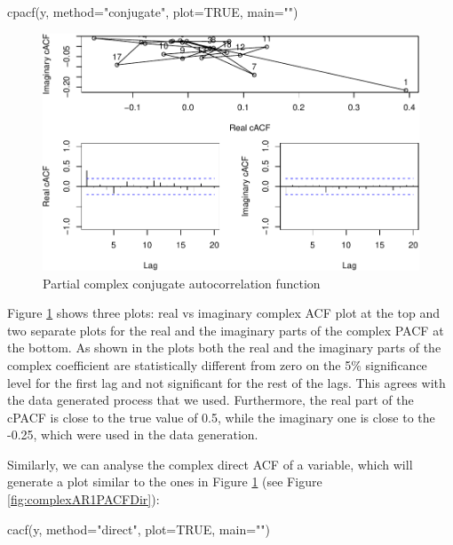 \documentclass[
]{book}
\newenvironment{Shaded}{\begin{snugshade}}{\end{snugshade}}
\newcommand{\AttributeTok}[1]{\textcolor[rgb]{0.77,0.63,0.00}{#1}}
\newcommand{\ConstantTok}[1]{\textcolor[rgb]{0.00,0.00,0.00}{#1}}
\newcommand{\FunctionTok}[1]{\textcolor[rgb]{0.00,0.00,0.00}{#1}}
\newcommand{\NormalTok}[1]{#1}
\newcommand{\StringTok}[1]{\textcolor[rgb]{0.31,0.60,0.02}{#1}}
\begin{document}
\begin{Shaded}
\begin{Highlighting}[]
\FunctionTok{cpacf}\NormalTok{(y, }\AttributeTok{method=}\StringTok{"conjugate"}\NormalTok{, }\AttributeTok{plot=}\ConstantTok{TRUE}\NormalTok{, }\AttributeTok{main=}\StringTok{""}\NormalTok{)}
\end{Highlighting}
\end{Shaded}

\begin{figure}
\centering
\includegraphics{Svetunkov---Svetunkov---Complex-Valued-Econometrics_files/figure-latex/complexAR1PACFConj-1.pdf}
\caption{\label{fig:complexAR1PACFConj}Partial complex conjugate autocorrelation function}
\end{figure}

Figure \ref{fig:complexAR1PACFConj} shows three plots: real vs imaginary complex ACF plot at the top and two separate plots for the real and the imaginary parts of the complex PACF at the bottom. As shown in the plots both the real and the imaginary parts of the complex coefficient are statistically different from zero on the 5\% significance level for the first lag and not significant for the rest of the lags. This agrees with the data generated process that we used. Furthermore, the real part of the cPACF is close to the true value of 0.5, while the imaginary one is close to the -0.25, which were used in the data generation.

Similarly, we can analyse the complex direct ACF of a variable, which will generate a plot similar to the ones in Figure \ref{fig:complexAR1PACFConj} (see Figure \ref{fig:complexAR1PACFDir}):

\begin{Shaded}
\begin{Highlighting}[]
\FunctionTok{cacf}\NormalTok{(y, }\AttributeTok{method=}\StringTok{"direct"}\NormalTok{, }\AttributeTok{plot=}\ConstantTok{TRUE}\NormalTok{, }\AttributeTok{main=}\StringTok{""}\NormalTok{)}
\end{Highlighting}
\end{Shaded}
\end{document}
